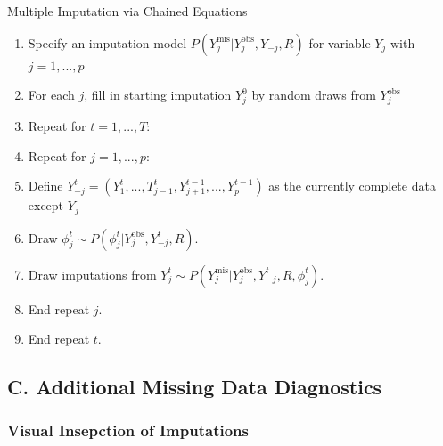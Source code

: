 \documentclass[12pt,]{article}
\newcommand{\appendixC}{ \setcounter{table}{0} \renewcommand{\thetable}{C\arabic{table}} \setcounter{figure}{0} \renewcommand{\thefigure}{C\arabic{figure}} }
\begin{document}
\begin{algorithm}[H]
\label{alg:mice-alg}
\caption{Multiple Imputation via Chained Equations}
\DontPrintSemicolon
\SetAlgoLined
\BlankLine

\begin{enumerate}
  \item Specify an imputation model $P(Y^{\text{mis}}_j \vert Y^{\text{obs}}_j, Y_{-j}, R)$ for variable $Y_j$ with $j=1,...,p$
  \item For each $j$, fill in starting imputation $Y^0_j$ by random draws from $Y^{\text{obs}}_j$
  \item Repeat for $t=1,...,T:$
  \item Repeat for $j=1,...,p:$
  \item Define $Y^t_{-j} = (Y^t_1,...,T^t_{j-1}, Y^{t-1}_{j+1},..., Y^{t-1}_p)$ as the currently complete data except $Y_j$ 
  \item Draw $\phi^t_j \sim P(\phi^t_j \vert Y^{\text{obs}}_j, Y^t_{-j}, R)$.
  \item Draw imputations from $Y^t_j \sim P(Y^{ \text{mis} }_j \vert Y^{ \text{obs} }_j, Y^t_{-j}, R, \phi^t_j)$.
  \item End repeat $j$.
  \item End repeat $t$.

\end{enumerate}
\BlankLine

\end{algorithm}

\newpage

\subsection*{C. Additional Missing Data
Diagnostics}\label{c.-additional-missing-data-diagnostics}

\appendixC

\subsubsection{Visual Insepction of
Imputations}\label{visual-insepction-of-imputations}
\end{document}
